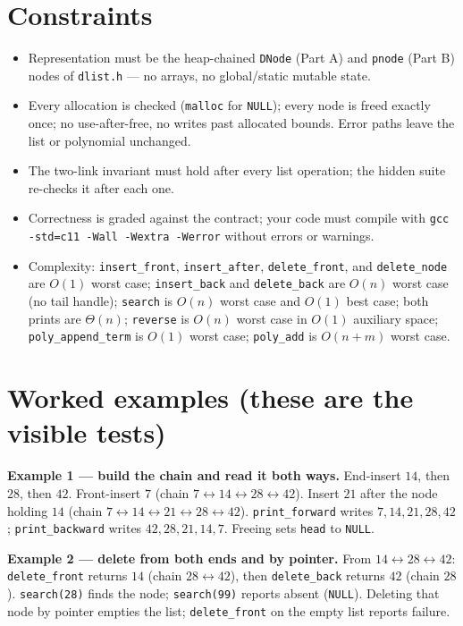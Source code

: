 \documentclass[11pt]{article}
\begin{document}
\section{Constraints}

\begin{itemize}
  \item Representation must be the heap-chained \texttt{DNode} (Part A) and \texttt{pnode} (Part B) nodes of \texttt{dlist.h} --- no arrays, no global/static mutable state.
  \item Every allocation is checked (\texttt{malloc} for \texttt{NULL}); every node is freed exactly once; no use-after-free, no writes past allocated bounds. Error paths leave the list or polynomial unchanged.
  \item The two-link invariant must hold after every list operation; the hidden suite re-checks it after each one.
  \item Correctness is graded against the contract; your code must compile with \texttt{gcc -std=c11 -Wall -Wextra -Werror} without errors or warnings.
  \item Complexity: \texttt{insert\_front}, \texttt{insert\_after}, \texttt{delete\_front}, and \texttt{delete\_node} are $O(1)$ worst case; \texttt{insert\_back} and \texttt{delete\_back} are $O(n)$ worst case (no tail handle); \texttt{search} is $O(n)$ worst case and $O(1)$ best case; both prints are $\Theta(n)$; \texttt{reverse} is $O(n)$ worst case in $O(1)$ auxiliary space; \texttt{poly\_append\_term} is $O(1)$ worst case; \texttt{poly\_add} is $O(n+m)$ worst case.
\end{itemize}

\section{Worked examples (these are the visible tests)}

\textbf{Example 1 --- build the chain and read it both ways.} End-insert $14$, then $28$, then $42$. Front-insert $7$ (chain $7 \leftrightarrow 14 \leftrightarrow 28 \leftrightarrow 42$). Insert $21$ after the node holding $14$ (chain $7 \leftrightarrow 14 \leftrightarrow 21 \leftrightarrow 28 \leftrightarrow 42$). \texttt{print\_forward} writes $7, 14, 21, 28, 42$; \texttt{print\_backward} writes $42, 28, 21, 14, 7$. Freeing sets \texttt{head} to \texttt{NULL}.

\textbf{Example 2 --- delete from both ends and by pointer.} From $14 \leftrightarrow 28 \leftrightarrow 42$: \texttt{delete\_front} returns $14$ (chain $28 \leftrightarrow 42$), then \texttt{delete\_back} returns $42$ (chain $28$). \texttt{search(28)} finds the node; \texttt{search(99)} reports absent (\texttt{NULL}). Deleting that node by pointer empties the list; \texttt{delete\_front} on the empty list reports failure.
\end{document}
